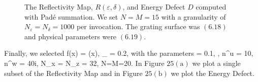 %
%
\vspace{-16mm}
\begin{figure}[H]
    \centering
    \vspace{2mm}
    \caption{The Reflectivity Map, $R(\varepsilon,\delta)$, and Energy Defect $D$
    computed with Pad\'e summation. We set $N=M=15$ 
    with a granularity of $N_{\varepsilon}=N_{\delta}=1000$ per invocation. The grating surface was $(6.18)$ and physical parameters were $(6.19)$.}
    \label{Fig:RM:Single Case 1}
\end{figure}
\vspace{-18mm}
\hspace{-6mm}Finally, we selected
\be
f(x) = \sin(x),
\quad
\varepsilon_{} = 0.2,
\ee
with the parameters
\be
\alpha = 0.1,
\quad
{},
\quad
n^u = 10,
\quad
n^w = 40i,
\quad
N_x = N_z = 32,
\quad
N=M=20.
\ee
In Figure $25(\text{a})$ we plot a single subset of the
Reflectivity Map and in 
Figure $25(\text{b})$ we plot the Energy Defect.


